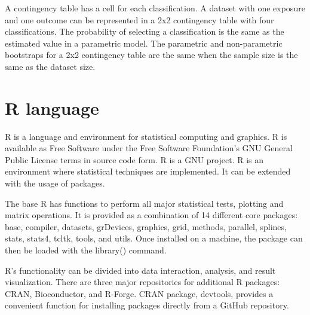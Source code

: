 A contingency table has a cell for each classification. A dataset with one exposure and one outcome can be represented in a 2x2 contingency table with four classifications. The probability of selecting a classification is the same as the estimated value in a parametric model. The parametric and non-parametric bootstraps for a 2x2 contingency table are the same when the sample size is the same as the dataset size.\cite{Pirikahu2016BayesianMO} 

\section{R language}\label{Rlanguage}

R is a language and environment for statistical computing and graphics. R is available as Free Software under the Free Software Foundation's GNU General Public License terms in source code form. R is a GNU project. R is an environment where statistical techniques are implemented. It can be extended with the usage of packages. \cite{RWebPage}

The base R has functions to perform all major statistical tests, plotting and matrix operations. It is provided as a combination of 14 different core packages: base, compiler, datasets, grDevices, graphics, grid, methods, parallel, splines, stats, stats4, tcltk, tools, and utils. Once installed on a machine, the package can then be loaded with the library() command.

R's functionality can be divided into data interaction, analysis, and result visualization. There are three major repositories for additional R packages: CRAN, Bioconductor, and R-Forge. CRAN package, devtools, provides a convenient function for installing packages directly from a GitHub repository. \cite{Giorgi2022TheRL}
